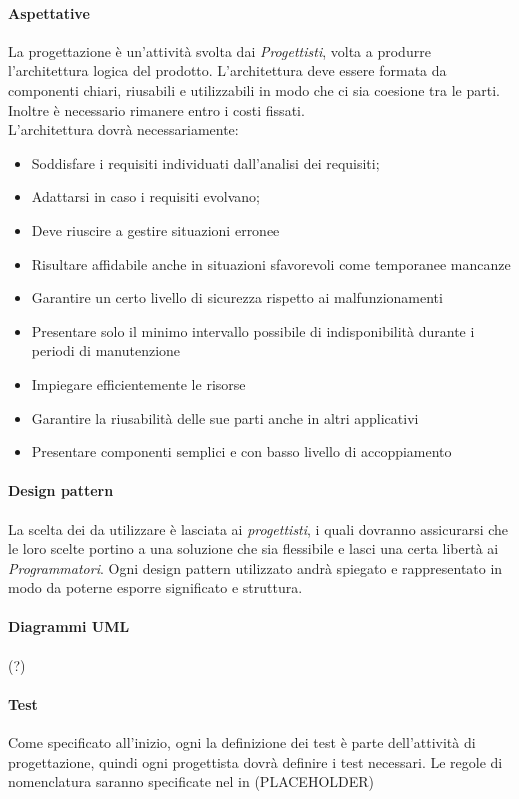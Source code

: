 \documentclass[../norme-di-progetto.tex]{subfiles}
\begin{document}
 \paragraph{Aspettative}
 La progettazione è un'attività svolta dai \emph{Progettisti}, volta a produrre l'architettura logica del prodotto. L'architettura deve essere formata da componenti chiari, riusabili e utilizzabili in modo che ci sia coesione tra le parti. Inoltre è necessario rimanere entro i costi fissati.\\
 L'architettura dovrà necessariamente: 
 \begin{itemize}
     \item Soddisfare i requisiti individuati dall'analisi dei requisiti;
     \item Adattarsi in caso i requisiti evolvano;
     \item Deve riuscire a gestire situazioni erronee
     \item Risultare affidabile anche in situazioni sfavorevoli come temporanee mancanze
     \item Garantire un certo livello di sicurezza rispetto ai malfunzionamenti
     \item Presentare solo il minimo intervallo possibile di indisponibilità durante i periodi di manutenzione
     \item Impiegare efficientemente le risorse
     \item Garantire la riusabilità delle sue parti anche in altri applicativi
     \item Presentare componenti semplici e con basso livello di accoppiamento
 \end{itemize}
 
 
 \paragraph{Design pattern}
 La scelta dei  da utilizzare è lasciata ai \emph{progettisti}, i quali dovranno assicurarsi che le loro scelte portino a una soluzione che sia flessibile e lasci una certa libertà ai \emph{Programmatori}. Ogni design pattern utilizzato andrà spiegato e rappresentato in modo da poterne esporre significato e struttura.
 
 \paragraph{Diagrammi UML}
 (?)
 
 
 \paragraph{Test}
  Come specificato all'inizio, ogni la definizione dei test è parte dell'attività di progettazione, quindi ogni progettista dovrà definire i test necessari. Le regole di nomenclatura saranno specificate nel in (PLACEHOLDER)
  
\end{document}
